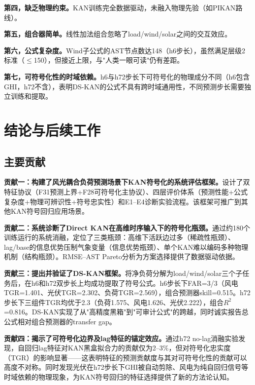 \documentclass[12pt,a4paper,oneside]{ctexbook}
\begin{document}
\textbf{第四，缺乏物理约束。}KAN训练完全数据驱动，未融入物理先验（如PIKAN\cite{shuai2024pikan}路线）。

\textbf{第五，组合器简单。}线性加法组合忽略了load/wind/solar之间的交互效应。

\textbf{第六，公式复杂度。}Wind子公式的AST节点数达148（h6步长），虽然满足层级2标准（$\leq$150），但接近上限，与"人类一眼可读"仍有差距。

\textbf{第七，可符号化性的时域依赖。}h6与h72步长下可符号化的物理成分不同（h6包含GHI，h72不含），表明DS-KAN的公式不具有跨时域通用性，不同预测步长需要独立训练和提取。


\chapter{结论与后续工作}

\section{主要贡献}

\textbf{贡献一：构建了风光耦合负荷预测场景下KAN符号化的系统评估框架。}设计了双特征协议（F31预测上界+F28可符号化主协议）、四层评价体系（预测性能+公式复杂度+物理可辨识性+符号忠实性）和E1--E4诊断实验流程。该框架可推广到其他KAN符号回归应用场景。

\textbf{贡献二：系统诊断了Direct KAN在高维时序输入下的符号化瓶颈。}通过约180个训练运行的系统消融，定位了三类瓶颈：高维下活跃边过多（稀疏性瓶颈）、lag/base的信息优势压制气象变量（信息优势瓶颈）、单个KAN难以编码多种物理机制（结构瓶颈）。RMSE--AST Pareto分析为方案选择提供了数据驱动依据。

\textbf{贡献三：提出并验证了DS-KAN框架。}将净负荷分解为load/wind/solar三个子任务后，在h6和h72双步长上均成功提取了符号公式。h6步长下FAR=3/3（风电TGR=1.401、光伏TGR=2.302、负荷TGR=2.569），组合预测器skill=0.515。h72步长下三组件TGR均优于2.3（负荷1.575、风电1.626、光伏2.222），组合$R^2$=0.816。DS-KAN实现了从"高精度黑箱"到"可审计公式"的跨越，同时诚实报告总公式相对组合预测器的transfer gap。

\textbf{贡献四：揭示了可符号化边界及lag特征的锚定效应。}通过h72 no-lag消融实验发现，自回归lag特征对KAN黑盒拟合力的贡献仅为2--3\%，但对符号化忠实度（TGR）的影响显著——这表明特征的预测贡献度与其对可符号化性的贡献可以高度不对称。同时发现光伏在h72步长下GHI被自动剪除、风电为纯自回归信号等时域依赖的物理现象，为KAN符号回归的特征选择提供了新的方法论认知。
\end{document}
